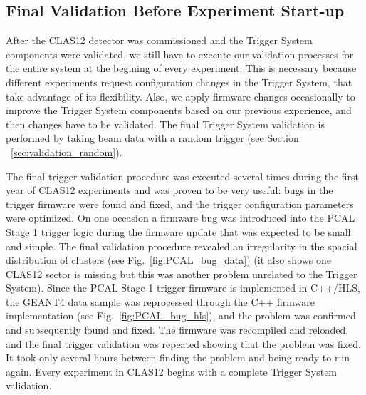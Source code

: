 








\subsection{Final Validation Before Experiment Start-up}

After the CLAS12 detector was commissioned and the Trigger System components were validated, we still have to execute our validation processes for the entire system at the begining of every experiment. This is necessary because different experiments request configuration changes in the Trigger System, that take advantage of its flexibility. Also, we apply firmware changes occasionally to improve the Trigger System components based on our previous experience, and then changes have to be validated. The final Trigger System validation is performed by taking beam data with a random trigger (see Section ~\ref{sec:validation_random}).

The final trigger validation procedure was executed several times during the first year of CLAS12 experiments and was proven to be very useful: bugs in the trigger firmware were found and fixed, and the trigger configuration parameters were optimized. On one occasion a firmware bug was introduced into the PCAL Stage 1 trigger logic during the firmware update that was expected to be small and simple. The final validation procedure revealed an irregularity in the spacial distribution of clusters (see Fig.~\ref{fig:PCAL_bug_data}) (it also shows one CLAS12 sector is missing but this was another problem unrelated to the Trigger System). Since the PCAL Stage 1 trigger firmware is implemented in C++/HLS, the GEANT4 data sample was reprocessed through the C++ firmware implementation (see Fig.~\ref{fig:PCAL_bug_hls}), and the problem was confirmed and subsequently found and fixed. The firmware was recompiled and reloaded, and the final trigger validation was repeated showing that the problem was fixed. It took only several hours between finding the problem and being ready to run again. Every experiment in CLAS12 begins with a complete Trigger System validation. 

